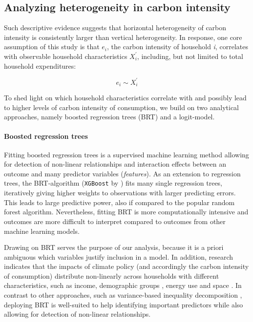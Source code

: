 \documentclass[12pt, a4paper]{article}
\begin{document}
\subsection{Analyzing heterogeneity in carbon intensity} \label{sec:methods}

Such descriptive evidence suggests that horizontal heterogeneity of carbon intensity is consistently larger than vertical heterogeneity. In response, one core assumption of this study is that $e_{i}$, the carbon intensity of household \textit{i}, correlates with observable household characteristics $X_{i}^{'}$, including, but not limited to total household expenditures:

\begin{equation} \label{eq:relationship}
    e_{i} \sim X_{i}^{'}
\end{equation}


To shed light on which household characteristics correlate with and possibly lead to higher levels of carbon intensity of consumption, we build on two analytical approaches, namely boosted regression trees (BRT) and a logit-model.

\paragraph{Boosted regression trees} Fitting boosted regression trees \autocite{Friedman.2003, Elith.2008} is a supervised machine learning method allowing for detection of non-linear relationships and interaction effects between an outcome and many predictor variables (\textit{features}). As an extension to regression trees, the BRT-algorithm (\texttt{XGBoost} by \textcite{Chen.2016}) fits many single regression trees, iteratively giving higher weights to observations with larger predicting errors. This leads to large predictive power, also if compared to the popular random forest algorithm. Nevertheless, fitting BRT is more computationally intensive and outcomes are more difficult to interpret compared to outcomes from other machine learning models. 

Drawing on BRT serves the purpose of our analysis, because it is a priori ambiguous which variables justify inclusion in a model. In addition, research indicates that the impacts of climate policy (and accordingly the carbon intensity of consumption) distribute non-linearly across households with different characteristics, such as income, demographic groups \autocite{Missbach.2023}, energy use \autocite{Farrell.2017} and space \autocite{Chan.2023}. In contrast to other approaches, such as variance-based inequality decomposition \autocite{Farrell.2017,Sager.2019b,Missbach.2024}, deploying BRT is well-suited to help identifying important predictors while also allowing for detection of non-linear relationships.
\end{document}
